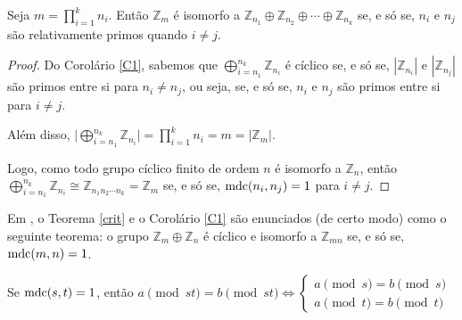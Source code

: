	\begin{corollary}
	\label{C2}
		Seja $\displaystyle{m = \prod_{i=1}^{k}n_i}$. Então $\mathbb{Z}_m$ 
		é isomorfo a
		$\mathbb{Z}_{n_1}\oplus\mathbb{Z}_{n_2}\oplus\cdots\oplus\mathbb{Z}_{n_k}$ 
		se, e só se, $n_i$ e $n_j$ são relativamente primos quando $i\neq j$.
	\end{corollary}
	\begin{proof}
		Do Corolário \ref{C1}, sabemos que
		$\displaystyle{\bigoplus_{i=n_1}^{n_k} \mathbb{Z}_{n_i}}$ é cíclico
		se, e só se, $|\mathbb{Z}_{n_i}|$ e $|\mathbb{Z}_{n_j}|$ são primos
		entre si para $n_i\neq n_j$, ou seja, se, e só se, $n_i$ e $n_j$ são
		primos entre si para $i\neq j$. 
		\par\vspace{0.3cm} Além disso, 
		$\Bigg|\displaystyle{\bigoplus_{i=n_1}^{n_k} \mathbb{Z}_{n_i}\Bigg| 
		= \prod_{i = 1}^{k}n_i = m = |\mathbb{Z}_m|}$.
		\par\vspace{0.3cm} Logo, como todo grupo cíclico finito de ordem 
		$n$ é isomorfo a $\mathbb{Z}_n$, então
		$\displaystyle{\bigoplus_{i=n_1}^{n_k} \mathbb{Z}_{n_i} 
		\cong \mathbb{Z}_{n_1n_2\cdots n_k}} = \mathbb{Z}_m$ se, e só se,
		$\operatorname{mdc}(n_i, n_j) = 1$ para $i\neq j$. 
	\end{proof}
	\begin{remark}
        Em \cite{Livro-do-Fraleigh}, o Teorema \ref{crit} e o 
        Corolário \ref{C1} são enunciados (de certo modo) como o 
        seguinte teorema: o grupo $\mathbb{Z}_m\oplus\mathbb{Z}_n$ é 
        cíclico e isomorfo a $\mathbb{Z}_{mn}$ se, e só se, $\operatorname{mdc}(m,n) = 1$.
	\end{remark}
	\begin{lemma}
	\label{lema1}
		Se $\operatorname{mdc}(s, t) = 1$, então 
		$a\pmod {st} = b\pmod {st} \iff 
		\begin{cases}
		a\pmod s = b\pmod s \\ a\pmod t = b\pmod t
		\end{cases}$
	\end{lemma}
